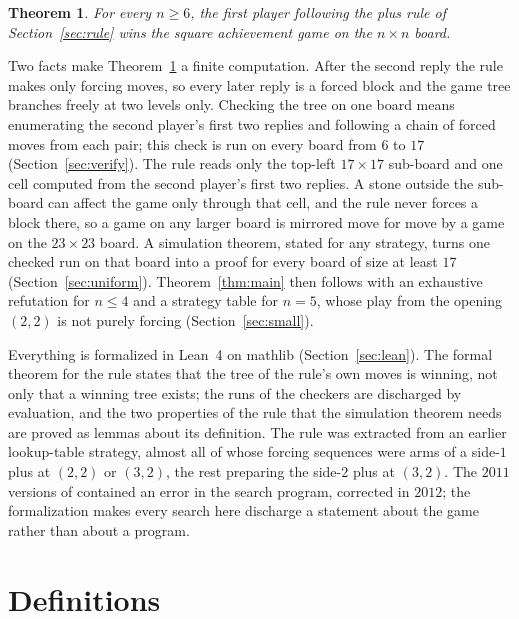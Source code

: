 \documentclass[11pt]{amsart}
\newtheorem{theorem}{Theorem}[section]
\theoremstyle{definition}
\theoremstyle{remark}
\begin{document}
\begin{theorem}\label{thm:rule}
For every $n \ge 6$, the first player following the plus rule of
Section~\ref{sec:rule} wins the square achievement game on the
$n \times n$ board.
\end{theorem}

Two facts make Theorem~\ref{thm:rule} a finite computation. After the
second reply the rule makes only forcing moves, so every later reply
is a forced block and the game tree branches freely at two levels only.
Checking the tree on one board means enumerating the second player's
first two replies and following a chain of forced moves from each pair;
this check is run on every board from $6$ to $17$
(Section~\ref{sec:verify}). The rule reads only the top-left
$17 \times 17$ sub-board and one cell computed from the second player's
first two replies. A stone outside the sub-board can affect the game
only through that cell, and the rule never forces a block there, so a
game on any larger board is mirrored move for move by a game on the
$23 \times 23$ board. A simulation theorem, stated for any strategy, turns one checked
run on that board into a proof for every board of size at least $17$
(Section~\ref{sec:uniform}). Theorem~\ref{thm:main} then follows with an
exhaustive refutation for $n \le 4$ and a strategy table for $n = 5$,
whose play from the opening $(2,2)$ is not purely forcing
(Section~\ref{sec:small}).

Everything is formalized in Lean~4 \cite{lean4} on mathlib
\cite{mathlib} (Section~\ref{sec:lean}). The formal theorem for the
rule states that the tree of the rule's own moves is winning, not only
that a winning tree exists; the runs of the checkers are discharged by
evaluation, and the two properties of the rule that the simulation
theorem needs are proved as lemmas about its definition. The rule was
extracted from an earlier lookup-table strategy, almost all of whose
forcing sequences were arms of a side-$1$ plus at $(2,2)$ or $(3,2)$,
the rest preparing the side-$2$ plus at $(3,2)$. The $2011$ versions of
\cite{jenrich} contained an error in the search program, corrected in
$2012$; the formalization makes every search here discharge a
statement about the game rather than about a program.

\section{Definitions}\label{sec:defs}
\end{document}
